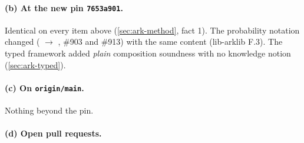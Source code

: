 \paragraph{(b) At the new pin \texttt{7653a901}.}
Identical on every item above (\cref{sec:ark-method}, fact 1). The probability notation changed
( $\to$ , \#903 and \#913) with the same content
(lib-arklib F.3). The typed framework added \emph{plain} composition soundness with no knowledge
notion (\cref{sec:ark-typed}).

\paragraph{(c) On \texttt{origin/main}.}
Nothing beyond the pin.

\paragraph{(d) Open pull requests.}
